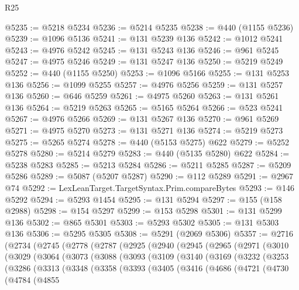 \begin{lexlean}{R25}
\begin{coremodule}
{{{{{{{{{{{{{{{{{{{{{{{{{{{{{{{{{{{{{{{{{{{{{{{{{{{{{{{{{{{{{{{{{{{{{{{{{{{{{{{{{{{{{{{{{{{{{{{{{{{{{{{{{{{{{{{{{{{{{{{{{{{{{{{{{{{{{{{{{{{{{{{{{{{{{{{{{{{{{{{{{{{{{{{{{{{{{{{{{{{{{{{{{{{{{{{{{{{{{{{@5235 := @5218 @5234
@5236 := @5214 @5235
@5238 := @440 (@1155 @5236)
@5239 := @1096 @5136
@5241 := @131 @5239 @136
@5242 := @1012 @5241
@5243 := @4976 @5242
@5245 := @131 @5243 @136
@5246 := @961 @5245
@5247 := @4975 @5246
@5249 := @131 @5247 @136
@5250 := @5219 @5249
@5252 := @440 (@1155 @5250)
@5253 := @1096 @5166
@5255 := @131 @5253 @136
@5256 := @1099 @5255
@5257 := @4976 @5256
@5259 := @131 @5257 @136
@5260 := @646 @5259
@5261 := @4975 @5260
@5263 := @131 @5261 @136
@5264 := @5219 @5263
@5265 := @5165 @5264
@5266 := @523 @5241
@5267 := @4976 @5266
@5269 := @131 @5267 @136
@5270 := @961 @5269
@5271 := @4975 @5270
@5273 := @131 @5271 @136
@5274 := @5219 @5273
@5275 := @5265 @5274
@5278 := @440 (@5153 @5275) @622
@5279 := @5252 @5278
@5280 := @5214 @5279
@5283 := @440 (@5135 @5280) @622
@5284 := @5238 @5283
@5285 := @5213 @5284
@5286 := @5211 @5285
@5287 := @5209 @5286
@5289 := @5087 (@5207 @5287)
@5290 := @112 @5289
@5291 := @2967 @74
@5292 := LexLeanTarget.TargetSyntax.Prim.compareBytes
@5293 := @146 @5292
@5294 := @5293 @1454
@5295 := @131 @5294
@5297 := @155 (@158 @2988)
@5298 := @154 @5297
@5299 := @153 @5298
@5301 := @131 @5299 @136
@5302 := @865 @5301
@5303 := @5293 @5302
@5305 := @131 @5303 @136
@5306 := @5295 @5305
@5308 := @5291 (@2069 @5306)
@5357 := @2716
    (@2734
      (@2745
        (@2778
          (@2787
            (@2925
              (@2940
                (@2945
                  (@2965
                    (@2971
                      (@3010
                        (@3029
                          (@3064
                            (@3073
                              (@3088
                                (@3093
                                  (@3109
                                    (@3140
                                      (@3169
                                        (@3232
                                          (@3253
                                            (@3286
                                              (@3313
                                                (@3348
                                                  (@3358
                                                    (@3393
                                                      (@3405
                                                        (@3416
                                                          (@4686
                                                            (@4721
                                                              (@4730
                                                                (@4784
                                                                  (@4855
}}}}}}}}}}}}}}}}}}}}}}}}}}}}}}}}}}}}}}}}}}}}}}}}}}}}}}}}}}}}}}}}}}}}}}}}}}}}}}}}}}}}}}}}}}}}}}}}}}}}}}}}}}}}}}}}}}}}}}}}}}}}}}}}}}}}}}}}}}}}}}}}}}}}}}}}}}}}}}}}}}}}}}}}}}}}}}}}}}}}}}}}}}}}}}}}}}}}}}}
\end{coremodule}
\end{lexlean}
